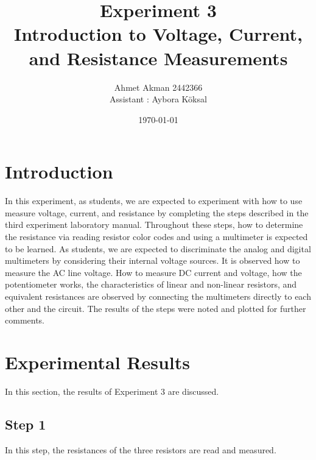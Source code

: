 \documentclass[letterpaper,12pt]{article}
\begin{document}
\title{Experiment 3 \protect\\Introduction to Voltage, Current, and Resistance Measurements}
\author{Ahmet Akman 2442366 \protect\\ Assistant : Aybora Köksal}
\date{\today}
\maketitle



\section{Introduction} 
In this experiment, as students, we are expected to experiment with how to use measure voltage, current, and resistance by completing the steps described in the third experiment laboratory manual. Throughout these steps, how to determine the resistance via reading resistor color codes and using a multimeter is expected to be learned. As students, we are expected to discriminate the analog and digital multimeters by considering their internal voltage sources. It is observed how to measure the AC line voltage. How to measure DC current and voltage, how the potentiometer works, the characteristics of linear and non-linear resistors, and equivalent resistances are observed by connecting the multimeters directly to each other and the circuit. The results of the steps were noted and plotted for further comments.
\section{Experimental Results}
In this section, the results of Experiment 3 are discussed.
\subsection{Step 1}
In this step, the resistances of the three resistors are read and measured. 
\end{document}
